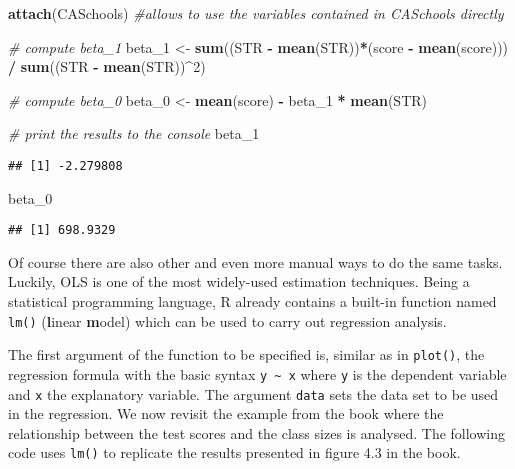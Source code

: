 \documentclass[]{book}
\newenvironment{Shaded}{\begin{snugshade}}{\end{snugshade}}
\newcommand{\KeywordTok}[1]{\textcolor[rgb]{0.13,0.29,0.53}{\textbf{#1}}}
\newcommand{\DecValTok}[1]{\textcolor[rgb]{0.00,0.00,0.81}{#1}}
\newcommand{\StringTok}[1]{\textcolor[rgb]{0.31,0.60,0.02}{#1}}
\newcommand{\CommentTok}[1]{\textcolor[rgb]{0.56,0.35,0.01}{\textit{#1}}}
\newcommand{\OperatorTok}[1]{\textcolor[rgb]{0.81,0.36,0.00}{\textbf{#1}}}
\newcommand{\NormalTok}[1]{#1}
\theoremstyle{definition}
\theoremstyle{definition}
\theoremstyle{definition}
\theoremstyle{remark}
\begin{document}
\begin{Shaded}
\begin{Highlighting}[]
\KeywordTok{attach}\NormalTok{(CASchools) }\CommentTok{#allows to use the variables contained in CASchools directly}

\CommentTok{# compute beta_1 }
\NormalTok{beta_}\DecValTok{1}\NormalTok{ <-}\StringTok{ }\KeywordTok{sum}\NormalTok{((STR }\OperatorTok{-}\StringTok{ }\KeywordTok{mean}\NormalTok{(STR))}\OperatorTok{*}\NormalTok{(score }\OperatorTok{-}\StringTok{ }\KeywordTok{mean}\NormalTok{(score))) }\OperatorTok{/}\StringTok{ }\KeywordTok{sum}\NormalTok{((STR }\OperatorTok{-}\StringTok{ }\KeywordTok{mean}\NormalTok{(STR))}\OperatorTok{^}\DecValTok{2}\NormalTok{)}

\CommentTok{# compute beta_0}
\NormalTok{beta_}\DecValTok{0}\NormalTok{ <-}\StringTok{ }\KeywordTok{mean}\NormalTok{(score) }\OperatorTok{-}\StringTok{ }\NormalTok{beta_}\DecValTok{1} \OperatorTok{*}\StringTok{ }\KeywordTok{mean}\NormalTok{(STR)}

\CommentTok{# print the results to the console}
\NormalTok{beta_}\DecValTok{1}
\end{Highlighting}
\end{Shaded}

\begin{verbatim}
## [1] -2.279808
\end{verbatim}

\begin{Shaded}
\begin{Highlighting}[]
\NormalTok{beta_}\DecValTok{0}
\end{Highlighting}
\end{Shaded}

\begin{verbatim}
## [1] 698.9329
\end{verbatim}

Of course there are also other and even more manual ways to do the same
tasks. Luckily, OLS is one of the most widely-used estimation
techniques. Being a statistical programming language, R already contains
a built-in function named \texttt{lm()} (\textbf{l}inear \textbf{m}odel)
which can be used to carry out regression analysis.

The first argument of the function to be specified is, similar as in
\texttt{plot()}, the regression formula with the basic syntax
\texttt{y\ \textasciitilde{}\ x} where \texttt{y} is the dependent
variable and \texttt{x} the explanatory variable. The argument
\texttt{data} sets the data set to be used in the regression. We now
revisit the example from the book where the relationship between the
test scores and the class sizes is analysed. The following code uses
\texttt{lm()} to replicate the results presented in figure 4.3 in the
book.
\end{document}
